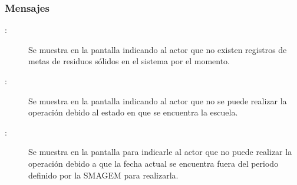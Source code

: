 \subsubsection{Mensajes}

    \begin{description}
	\item [:] Se muestra en la pantalla  indicando al actor que no existen registros de metas de residuos sólidos en el sistema por el momento.
	
	\item [:] Se muestra en la pantalla  indicando al actor que no se puede realizar la operación debido al estado en que se encuentra la escuela.
	
	\item [:] Se muestra en la pantalla  para indicarle al actor que no puede realizar la operación debido a que la fecha actual se encuentra fuera del periodo definido por la SMAGEM para realizarla.
    \end{description}
